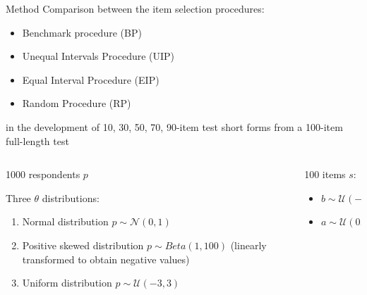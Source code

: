 \documentclass[final,t]{beamer}
\begin{document}
\begin{frame}
\begin{columns}[t]
			
			
			\begin{column}{.45\linewidth}
				
		\begin{block}{\centering Method}
			Comparison between the item selection procedures: 
			\begin{itemize}
				\item Benchmark procedure (BP)
				\item Unequal Intervals Procedure (UIP)
				\item Equal Interval Procedure (EIP)
				\item Random Procedure (RP)
			\end{itemize}
		in the development of 10, 30, 50, 70, 90-item test short forms from a  100-item full-length test 
			\begin{columns}
				\begin{column}{.50\linewidth}
					\begin{center}
						1000 respondents $p$
					\end{center}
					Three $\theta$ distributions: 
					\begin{enumerate}
						\item Normal distribution $p \sim \mathcal{N}(0,1)$
						\item Positive skewed distribution $p \sim Beta(1, 100)$ (linearly transformed to obtain negative values)
						\item Uniform distribution $p \sim \mathcal{U}(-3,3)$
					\end{enumerate}
					
				\end{column}
				
				\begin{column}{.50\linewidth}
					\begin{center}
						100 items $s$:
					\end{center}
					\begin{itemize}
						\item $b \sim \mathcal{U}(-3,3)$
						\item  $a \sim \mathcal{U}(0.40,2)$
					\end{itemize}
				\end{column}
			\end{columns}
	
	\end{block}
				

\end{column}
\end{columns}
\end{frame}
\end{document}
